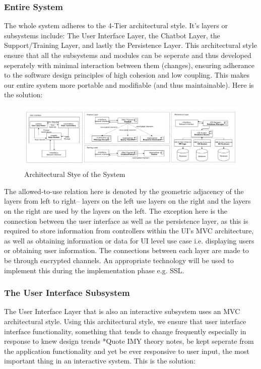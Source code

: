 \documentclass[11pt]{article}
\begin{document}
\subsubsection{Entire System}
The whole system adheres to the 4-Tier architectural style. It's layers or subsystems include: The User Interface Layer, the Chatbot Layer, the Support/Training Layer, and lastly the Persistence Layer. This architectural style ensure that all the subsystems and modules can be seperate and thus developed seperately with minimal interaction between them (changes), ensuring adherance to the software design principles of high cohesion and low coupling\cite{Book:2}. This makes our entire system more portable and modifiable (and thus maintainable). Here is the solution:

\begin{figure}[H]
	\centering
	\hspace*{-2.1cm}\includegraphics[width=1.25\textwidth]{../../images/Botic_Layered_Architecture.png}
	\caption{Architectural Stye of the System}
\end{figure}

The allowed-to-use relation here is denoted by the geometric adjacency of the layers from left to right-- layers on the left use layers on the right and the layers on the right are used by the layers on the left. The exception here is the connection between the user interface as well as the persistence layer, as this is required to store information from controllers within the UI's MVC architecture, as well as obtaining information or data for UI level use case i.e. displaying users or obtaining user information. The connections between each layer are made to be through encrypted channels. An appropriate technology will be used to implement this during the implementation phase e.g. SSL.

\subsubsection{The User Interface Subsystem}
The User Interface Layer that is also an interactive subsystem uses an MVC architectural style. Using this architectural style, we ensure that user interface interface functionality, something that tends to change frequently especially in response to knew design trends *Quote IMY theory notes, be kept seperate from the application functionality and yet be ever responsive to user input, the most important thing in an interactive system\cite{Book:2}. This is the solution:
\end{document}
